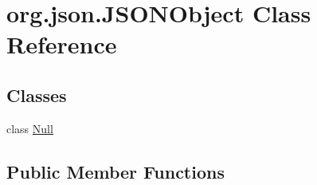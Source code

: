 \hypertarget{classorg_1_1json_1_1_j_s_o_n_object}{\section{org.\-json.\-J\-S\-O\-N\-Object Class Reference}
\label{classorg_1_1json_1_1_j_s_o_n_object}
}
\subsection*{Classes}
\begin{DoxyCompactItemize}
\item 
class \hyperlink{classorg_1_1json_1_1_j_s_o_n_object_1_1_null}{Null}
\end{DoxyCompactItemize}
\subsection*{Public Member Functions}

